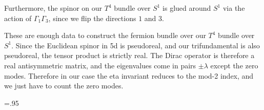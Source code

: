 \documentclass[12pt]{article}
\numberwithin{equation}{section}
\begin{document}
Furthermore, the spinor on our $T^4$ bundle over $S^1$ is glued around $S^1$ via the action of $\Gamma_1\Gamma_3$, 
since we flip the directions $1$ and $3$.

These are enough data to construct the fermion bundle over our $T^4$ bundle over $S^1$. 
Since the Euclidean spinor in 5d is pseudoreal, and our trifundamental is also pseudoreal,
the tensor product is strictly real.
The Dirac operator is therefore a real antisymmetric matrix, and the eigenvalues come in pairs $\pm \lambda$
except the zero modes.
Therefore in our case the eta invariant reduces to the mod-2 index,
and we just have to count the zero modes.




\baselineskip=.95\baselineskip

\end{document}
